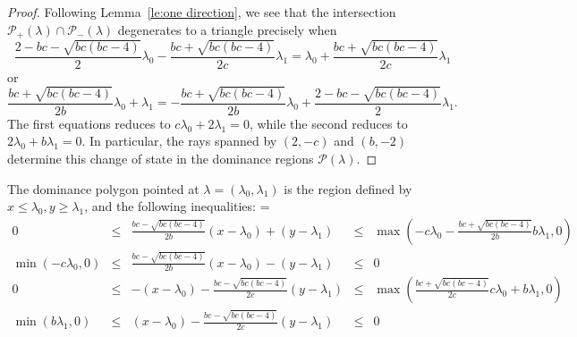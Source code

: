 \documentclass{amsart}
\numberwithin{theorem}{section}
\newcommand{\cP}{\mathcal{P}}
\begin{document}
  \begin{proof}
    Following Lemma~\ref{le:one direction}, we see that the intersection $\cP_+(\lambda)\cap\cP_-(\lambda)$ degenerates to a triangle precisely when
    \[\frac{2-bc-\sqrt{bc(bc-4)}}{2}\lambda_0-\frac{bc+\sqrt{bc(bc-4)}}{2c}\lambda_1=\lambda_0+\frac{bc+\sqrt{bc(bc-4)}}{2c}\lambda_1\]
    or 
    \[\frac{bc+\sqrt{bc(bc-4)}}{2b}\lambda_0+\lambda_1=-\frac{bc+\sqrt{bc(bc-4)}}{2b}\lambda_0+\frac{2-bc-\sqrt{bc(bc-4)}}{2}\lambda_1.\]
    The first equations reduces to $c\lambda_0+2\lambda_1=0$, while the second reduces to $2\lambda_0+b\lambda_1=0$.
    In particular, the rays spanned by $(2,-c)$ and $(b,-2)$ determine this change of state in the dominance regions $\cP(\lambda)$.
  \end{proof}

  The dominance polygon pointed at $\lambda=(\lambda_0,\lambda_1)$ is the region defined by $x\leq \lambda_0, y\geq\lambda_1$, and the following inequalities:
 {
    \everymath={\displaystyle}
    \def\arraystretch{2.8}
  \[
  \begin{array}{rcccl}
    0 & \leq & \frac{b c-\sqrt{b c (b c-4)}}{2 b}(x-\lambda_0)+(y-\lambda_1) & \leq & \max\left(-c\lambda_0-\frac{b c+\sqrt{b c (b c-4)}}{2b}b\lambda_1,0\right)
    \\
    \min\left(-c\lambda_0,0\right) & \leq & \frac{b c-\sqrt{b c (b c-4)}}{2 b}(x-\lambda_0)-(y-\lambda_1) & \leq & 0
    \\
    0 & \leq &  -(x-\lambda_0)-\frac{b c-\sqrt{b c (b c-4)}}{2 c}(y-\lambda_1) & \leq & \max\left(\frac{b c+\sqrt{b c (b c-4)}}{2c}c\lambda_0+b\lambda_1,0\right)
    \\
    \min\left(b \lambda_1,0\right) & \leq & (x-\lambda_0) - \frac{b c-\sqrt{b c (b c-4)}}{2 c} (y-\lambda_1) & \leq & 0
  \end{array}
\]
}
\end{document}
